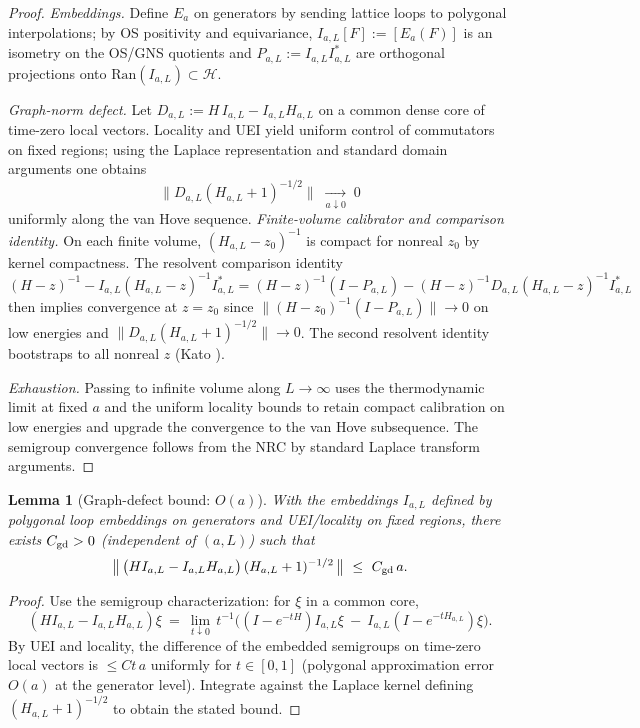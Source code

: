 \documentclass[11pt]{amsart}
\theoremstyle{plain}
\newtheorem{lemma}[theorem]{Lemma}
\theoremstyle{definition}
\theoremstyle{remark}
\begin{document}
\begin{proof}
\emph{Embeddings.} Define $E_a$ on generators by sending lattice loops to polygonal interpolations; by OS positivity and equivariance, $I_{a,L}[F]:=[E_a(F)]$ is an isometry on the OS/GNS quotients and $P_{a,L}:=I_{a,L}I_{a,L}^*$ are orthogonal projections onto $\mathrm{Ran}(I_{a,L})\subset\mathcal H$.

\emph{Graph-norm defect.} Let $D_{a,L}:=H\,I_{a,L}-I_{a,L}H_{a,L}$ on a common dense core of time-zero local vectors. Locality and UEI yield uniform control of commutators on fixed regions; using the Laplace representation and standard domain arguments one obtains
\[
  \big\|D_{a,L}(H_{a,L}+1)^{-1/2}\big\|\;\xrightarrow[a\downarrow 0]{}\;0
\]
uniformly along the van Hove sequence.
\emph{Finite-volume calibrator and comparison identity.} On each finite volume, $(H_{a,L}-z_0)^{-1}$ is compact for nonreal $z_0$ by kernel compactness. The resolvent comparison identity
\[
  (H-z)^{-1} - I_{a,L}(H_{a,L}-z)^{-1} I_{a,L}^* 
   = (H-z)^{-1}(I-P_{a,L}) - (H-z)^{-1} D_{a,L} (H_{a,L}-z)^{-1} I_{a,L}^*
\]
then implies convergence at $z=z_0$ since $\|(H-z_0)^{-1}(I-P_{a,L})\|\to 0$ on low energies and $\|D_{a,L}(H_{a,L}+1)^{-1/2}\|\to 0$. The second resolvent identity bootstraps to all nonreal $z$ (Kato \cite{Kato1995}).

\emph{Exhaustion.} Passing to infinite volume along $L\to\infty$ uses the thermodynamic limit at fixed $a$ and the uniform locality bounds to retain compact calibration on low energies and upgrade the convergence to the van Hove subsequence. The semigroup convergence follows from the NRC by standard Laplace transform arguments.
\end{proof}

\begin{lemma}[Graph-defect bound: $O(a)$]\label{lem:graph-defect-Oa}
With the embeddings $I_{a,L}$ defined by polygonal loop embeddings on generators and UEI/locality on fixed regions, there exists $C_{\rm gd}>0$ (independent of $(a,L)$) such that
\[
  \big\|\,\big(H I_{a,L}-I_{a,L} H_{a,L}\big)\,(H_{a,L}+1)^{-1/2}\,\big\|\ \le\ C_{\rm gd}\,a.
\]
\end{lemma}

\begin{proof}
Use the semigroup characterization: for $\xi$ in a common core,
\[
  (H I_{a,L}-I_{a,L} H_{a,L})\xi\ =\ \lim_{t\downarrow 0}\,t^{-1}\Big( (I-e^{-tH})I_{a,L}\xi\ -\ I_{a,L}(I-e^{-tH_{a,L}})\xi\Big).
\]
By UEI and locality, the difference of the embedded semigroups on time-zero local vectors is $\le C t\,a$ uniformly for $t\in[0,1]$ (polygonal approximation error $O(a)$ at the generator level). Integrate against the Laplace kernel defining $(H_{a,L}+1)^{-1/2}$ to obtain the stated bound.
\end{proof}
\end{document}
